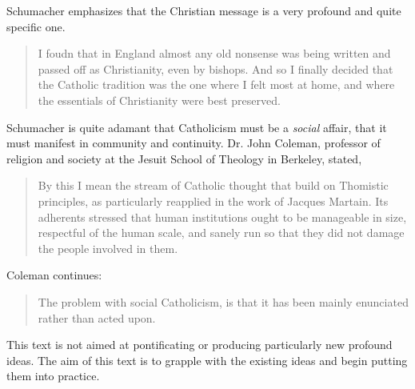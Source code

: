 \documentclass[10pt,letterpaper,openany]{book}
\begin{document}

Schumacher emphasizes that the Christian message is a very profound and quite specific one.

\begin{quote}
I foudn that in England almost any old nonsense was being written and passed off as Christianity, even by bishops. And so I finally decided that the Catholic tradition was the one where I felt most at home, and where the essentials of Christianity were best preserved.
\end{quote}

Schumacher is quite adamant that Catholicism must be a \textit{social} affair, that it must manifest in community and continuity. Dr. John Coleman, professor of religion and society at the Jesuit School of Theology in Berkeley, stated,

\begin{quote}
By this I mean the stream of Catholic thought that build on Thomistic principles, as particularly reapplied in the work of Jacques Martain. Its adherents stressed that human institutions ought to be manageable in size, respectful of the human scale, and sanely run so that they did not damage the people involved in them.
\end{quote}


Coleman continues:

\begin{quote}
The problem with social Catholicism, is that it has been mainly enunciated rather than acted upon.
\end{quote}

This text is not aimed at pontificating or producing particularly new profound ideas. The aim of this text is to grapple with the existing ideas and begin putting them into practice.
\end{document}

